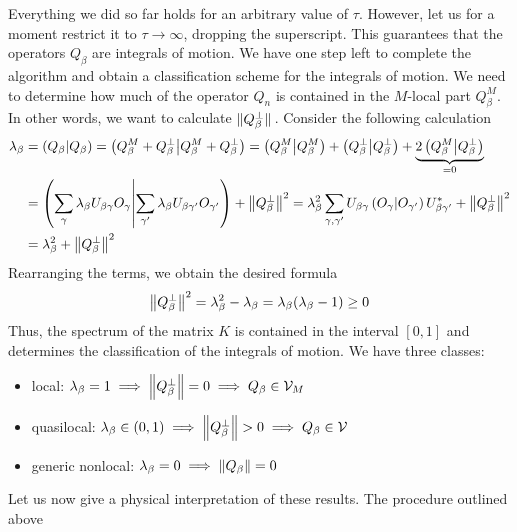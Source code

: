 Everything we did so far holds for an
arbitrary value of \(\tau\). However, let us for a moment restrict it to \(\tau\to \infty\), dropping the superscript.
This guarantees that the operators \(Q_{\beta}\) are integrals of motion.
We have one step left to complete the algorithm and obtain a classification scheme for the
integrals of motion. We need to determine how much of the operator \(Q_n\) is contained in the
\(M\)-local part \(Q_{\beta}^M\). In other words, we want to calculate \(\norm*{Q_{\beta}^{\perp}}\).
Consider the following calculation
\begin{align}
  \lambda_{\beta} & = \left(Q_{\beta} \middle| Q_{\beta}\right) = \left(Q_{\beta}^M + Q_{\beta}^{\perp} \middle| Q_{\beta}^M + Q_{\beta}^{\perp}\right) = \left(Q_{\beta}^M \middle| Q_{\beta}^M\right) +
  \left(Q_{\beta}^{\perp} \middle| Q_{\beta}^{\perp}\right) + \underbrace{2 \left(Q_{\beta}^M \middle| Q_{\beta}^{\perp}\right)}_{=0} \nonumber                                                                                         \\
                  & = \left(\sum_{\gamma} \lambda_{\beta} U_{\beta\gamma} O_{\gamma} \middle| \sum_{\gamma^{\prime}} \lambda_{\beta} U_{\beta\gamma^{\prime}} O_{\gamma^{\prime}}\right) + \norm{Q_{\beta}^{\perp}}^2 =
  \lambda_{\beta}^2 \sum_{\gamma,\gamma^{\prime}} U_{\beta\gamma} \left(O_{\gamma} \middle| O_{\gamma^{\prime}}\right) U_{\beta\gamma^{\prime}}^{\ast} + \norm{Q_{\beta}^{\perp}}^2  \nonumber                          \\
                  & =\lambda_{\beta}^2 + \norm{Q_{\beta}^{\perp}}^2
\end{align}
Rearranging the terms, we obtain the desired formula
\begin{equation}
  \norm{Q_{\beta}^{\perp}}^2 = \lambda_{\beta}^2 - \lambda_{\beta} = \lambda_{\beta} (\lambda_{\beta} - 1) \geq 0
  \label{eq:liom_norm}
\end{equation}
Thus, the spectrum of the matrix \(K\) is contained in the interval \([0,1]\) and
determines the classification of the integrals of motion. We have three classes:
\begin{itemize}
  \item local: \(\lambda_{\beta} = 1 \implies \norm{Q_{\beta}^{\perp}} = 0 \implies Q_{\beta} \in \mathcal{V}_M\)
  \item quasilocal: \(\lambda_{\beta} \in \left(0,1\right) \implies \norm{Q_{\beta}^{\perp}} > 0 \implies Q_{\beta} \in \mathcal{V} \)
  \item generic nonlocal: \(\lambda_{\beta} = 0 \implies \norm{Q_{\beta}} = 0\)
\end{itemize}
Let us now give a physical interpretation of these results. The procedure outlined above

